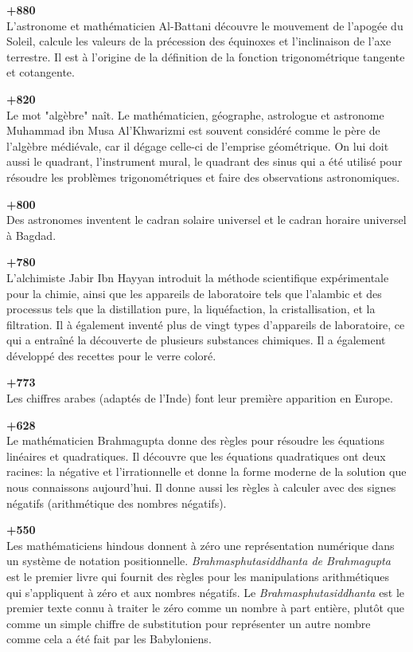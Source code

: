 \textbf{+880}\\
L'astronome et mathématicien Al-Battani découvre le mouvement de l'apogée du Soleil, calcule les valeurs de la précession des équinoxes et l'inclinaison de l'axe terrestre. Il est à l'origine de la définition de la fonction trigonométrique tangente et cotangente.

\textbf{+820}\\
Le mot "algèbre" naît. Le mathématicien, géographe, astrologue et astronome Muhammad ibn Musa Al'Khwarizmi est souvent considéré comme le père de l'algèbre médiévale, car il dégage celle-ci de l'emprise géométrique. On lui doit aussi le quadrant, l'instrument mural, le quadrant des sinus qui a été utilisé pour résoudre les problèmes trigonométriques et faire des observations astronomiques.

\textbf{+800}\\
Des astronomes inventent le cadran solaire universel et le cadran horaire universel à Bagdad.

\textbf{+780}\\
L'alchimiste Jabir Ibn Hayyan introduit la méthode scientifique expérimentale pour la chimie, ainsi que les appareils de laboratoire tels que l'alambic et des processus tels que la distillation pure, la liquéfaction, la cristallisation, et la filtration. Il à également inventé plus de vingt types d'appareils de laboratoire, ce qui a entraîné la découverte de plusieurs substances chimiques. Il a également développé des recettes pour le verre coloré.

\textbf{+773}\\
Les chiffres arabes (adaptés de l'Inde) font leur première apparition en Europe.

\textbf{+628}\\
Le mathématicien Brahmagupta donne des règles pour résoudre les équations linéaires et quadratiques. Il découvre que les équations quadratiques ont deux racines: la négative et l'irrationnelle et donne la forme moderne de la solution que nous connaissons aujourd'hui. Il donne aussi les règles à calculer avec des signes négatifs (arithmétique des nombres négatifs).

\textbf{+550}\\
Les mathématiciens hindous donnent à zéro une représentation numérique dans un système de notation positionnelle. \textit{Brahmasphutasiddhanta de Brahmagupta} est le premier livre qui fournit des règles pour les manipulations arithmétiques qui s'appliquent à zéro et aux nombres négatifs. Le \textit{Brahmasphutasiddhanta} est le premier texte connu à traiter le zéro comme un nombre à part entière, plutôt que comme un simple chiffre de substitution pour représenter un autre nombre comme cela a été fait par les Babyloniens.

